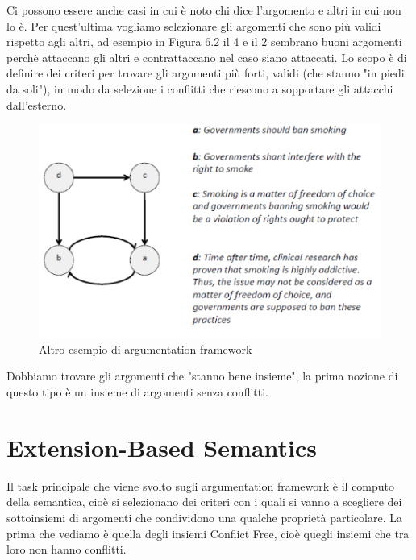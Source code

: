 Ci possono essere anche casi in cui è noto chi dice l’argomento e altri in cui non lo è. Per quest’ultima vogliamo selezionare gli argomenti che sono più validi rispetto agli altri, ad esempio in Figura 6.2 il 4 e il 2 sembrano buoni argomenti perchè attaccano gli altri e contrattaccano nel caso siano attaccati. Lo scopo è di definire dei criteri per trovare gli argomenti più forti, validi (che stanno "in piedi da soli"), in modo da selezione i conflitti che riescono a sopportare gli attacchi dall’esterno.
\begin{figure}[htp]
	\centering
    \includegraphics[width=12cm, keepaspectratio]{img/Cap6/arg3.png}
    \caption{Altro esempio di argumentation framework}
\end{figure}
Dobbiamo trovare gli argomenti che "stanno bene insieme", la prima nozione di questo tipo è un insieme di argomenti senza conflitti.
\section{Extension-Based Semantics}
Il task principale che viene svolto sugli argumentation framework è il computo della semantica, cioè si selezionano dei criteri con i quali si vanno a scegliere dei sottoinsiemi di argomenti che condividono una qualche proprietà particolare. La prima che vediamo è quella degli insiemi Conflict Free, cioè quegli insiemi che tra loro non hanno conflitti.
